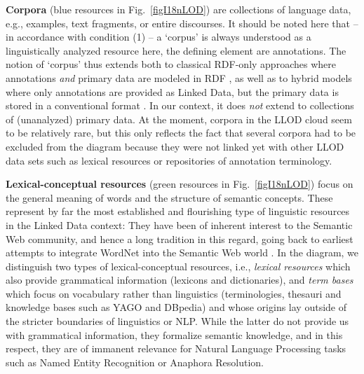 \textbf{Corpora} (blue resources in Fig.\ \ref{figI18nLOD}) are collections of language data, e.g., examples, text fragments, or entire discourses.
It should be noted here that -- in accordance with condition (1) -- a `corpus' is always understood as a linguistically analyzed resource here, the defining element are annotations.
The notion of `corpus' thus extends both to classical RDF-only approaches where annotations \emph{and} primary data are modeled in RDF \citep{burchardt2008formalising}, 
as well as to hybrid models where only annotations are provided as Linked Data, but the primary data is stored in a conventional format \citep{cassidy2010rdf}. 
In our context, it does \emph{not} extend to collections of (unanalyzed) primary data. 
At the moment, corpora in the LLOD cloud seem to be relatively rare, 
but this only reflects the fact that several corpora had to be excluded from the diagram because they were not linked yet with other LLOD data sets such as lexical resources or repositories of annotation terminology.

\textbf{Lexical-conceptual resources} (green resources in Fig.\ \ref{figI18nLOD}) focus on the general meaning of words and the structure of semantic concepts. 
These represent by far the most established and flourishing type of linguistic resources in the Linked Data context: They have been of inherent interest to the Semantic Web community, and hence a long tradition in this regard, going back to earliest attempts to integrate WordNet into the Semantic Web world \citep{gangemi2003ontowordnet}. 
In the diagram, we distinguish two types of lexical-conceptual resources, i.e., 
\emph{lexical resources} which also provide grammatical information (lexicons and dictionaries), and 
\emph{term bases} which focus on vocabulary rather than linguistics (terminologies, thesauri and knowledge bases such as YAGO and DBpedia) 
and whose origins lay outside of the stricter boundaries of linguistics or NLP. 
While the latter do not provide us with grammatical information, they formalize semantic knowledge, and in this respect, they are of immanent relevance for Natural Language Processing tasks such as Named Entity Recognition or Anaphora Resolution. 

